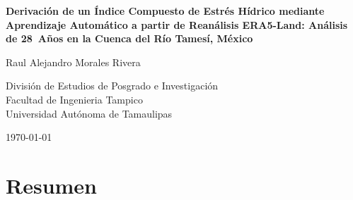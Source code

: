 \documentclass[12pt, a4paper]{article}
\begin{document}
\decimalpoint

\begin{titlepage}
\begin{center}
\vspace*{3cm}

{\Large\bfseries Derivación de un Índice Compuesto de Estrés Hídrico mediante Aprendizaje Automático a partir de Reanálisis ERA5-Land: Análisis de 28~Años en la Cuenca del Río Tamesí, México}

\vspace{2cm}

{\large Raul Alejandro Morales Rivera}

\vspace{0.5cm}

División de Estudios de Posgrado e Investigación\\
Facultad de Ingenieria Tampico\\
Universidad Autónoma de Tamaulipas

\vfill

{\small\today}

\end{center}
\end{titlepage}

\section*{Resumen}
\end{document}
